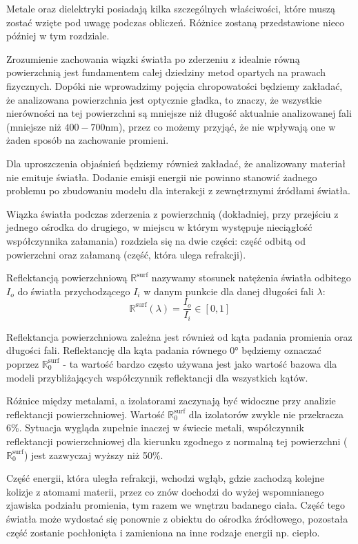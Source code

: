 \documentclass[../main.tex]{subfiles}
\begin{document}
Metale oraz dielektryki posiadają kilka szczególnych właściwości, które muszą zostać wzięte pod uwagę podczas obliczeń. Różnice zostaną przedstawione nieco później w tym rozdziale.

Zrozumienie zachowania wiązki światła po zderzeniu z idealnie równą powierzchnią jest fundamentem całej dziedziny metod opartych na prawach fizycznych. Dopóki nie wprowadzimy pojęcia chropowatości będziemy zakładać, że analizowana powierzchnia jest optycznie gładka, to znaczy, że wszystkie nierówności na tej powierzchni są mniejsze niż długość aktualnie analizowanej fali (mniejsze niż $400-700$nm), przez co możemy przyjąć, że nie wpływają one w żaden sposób na zachowanie promieni.

Dla uproszczenia objaśnień będziemy również zakładać, że analizowany materiał nie emituje światła. Dodanie emisji energii nie powinno stanowić żadnego problemu po zbudowaniu modelu dla interakcji z zewnętrznymi źródłami światła.

Wiązka światła podczas zderzenia z powierzchnią (dokładniej, przy przejściu z jednego ośrodka do drugiego, w miejscu w którym występuje nieciągłość współczynnika załamania) rozdziela się na dwie części: część odbitą od powierzchni oraz załamaną (część, która ulega refrakcji).

Reflektancją powierzchniową $\mathbb{R}^{\text{surf}}$ \cite{pbr_games_siggraph} nazywamy stosunek natężenia światła odbitego $I_o$ do światła przychodzącego $I_i$ w danym punkcie dla danej długości fali $\lambda$:
\[
	\mathbb{R}^{\text{surf}}(\lambda) = \frac{
        I_o
    }{
        I_i
    } \in \left[
        0, 1 
    \right]
\]

Reflektancja powierzchniowa zależna jest również od kąta padania promienia oraz długości fali. Reflektancję dla kąta padania równego $\ang{0}$ będziemy oznaczać poprzez $\mathbb{R}^{\text{surf}}_{0}$ - ta wartość bardzo często używana jest jako wartość bazowa dla modeli przybliżających współczynnik reflektancji dla wszystkich kątów. 

Różnice między metalami, a izolatorami zaczynają być widoczne przy analizie reflektancji powierzchniowej. Wartość $\mathbb{R}^{\text{surf}}_{0}$ dla izolatorów zwykle nie przekracza 6\%. Sytuacja wygląda zupełnie inaczej w świecie metali, współczynnik reflektancji powierzchniowej dla kierunku zgodnego z normalną tej powierzchni ($\mathbb{R}^{\text{surf}}_{0}$) jest zazwyczaj wyższy niż 50\%.

Część energii, która uległa refrakcji, wchodzi wgłąb, gdzie zachodzą kolejne kolizje z atomami materii, przez co znów dochodzi do wyżej wspomnianego zjawiska podziału promienia, tym razem we wnętrzu badanego ciała. Część tego światła może wydostać się ponownie z obiektu do ośrodka źródłowego, pozostała część zostanie pochłonięta i zamieniona na inne rodzaje energii np. ciepło.
\end{document}
